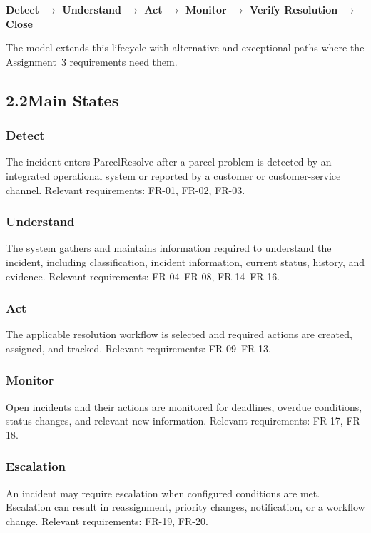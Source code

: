 \documentclass[11pt,a4paper]{article}
\begin{document}
\begin{center}
\textbf{Detect $\rightarrow$ Understand $\rightarrow$ Act $\rightarrow$ Monitor $\rightarrow$ Verify Resolution $\rightarrow$ Close}
\end{center}

The model extends this lifecycle with alternative and exceptional paths where the Assignment~3 requirements need them.

\subsection*{2.2\enspace Main States}

\subsubsection*{Detect}
The incident enters ParcelResolve after a parcel problem is detected by an integrated operational system or reported by a customer or customer-service channel. Relevant requirements: FR-01, FR-02, FR-03.

\subsubsection*{Understand}
The system gathers and maintains information required to understand the incident, including classification, incident information, current status, history, and evidence. Relevant requirements: FR-04–FR-08, FR-14–FR-16.

\subsubsection*{Act}
The applicable resolution workflow is selected and required actions are created, assigned, and tracked. Relevant requirements: FR-09–FR-13.

\subsubsection*{Monitor}
Open incidents and their actions are monitored for deadlines, overdue conditions, status changes, and relevant new information. Relevant requirements: FR-17, FR-18.

\subsubsection*{Escalation}
An incident may require escalation when configured conditions are met. Escalation can result in reassignment, priority changes, notification, or a workflow change. Relevant requirements: FR-19, FR-20.
\end{document}
